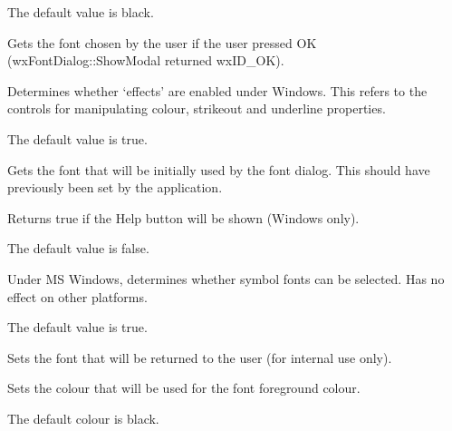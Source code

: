 The default value is black.



Gets the font chosen by the user if the user pressed OK (wxFontDialog::ShowModal returned wxID\_OK).



Determines whether `effects' are enabled under Windows. This refers to the
controls for manipulating colour, strikeout and underline properties.

The default value is true.



Gets the font that will be initially used by the font dialog. This should have
previously been set by the application.



Returns true if the Help button will be shown (Windows only).

The default value is false.



Under MS Windows, determines whether symbol fonts can be selected. Has no
effect on other platforms.

The default value is true.



Sets the font that will be returned to the user (for internal use only).



Sets the colour that will be used for the font foreground colour.

The default colour is black.



